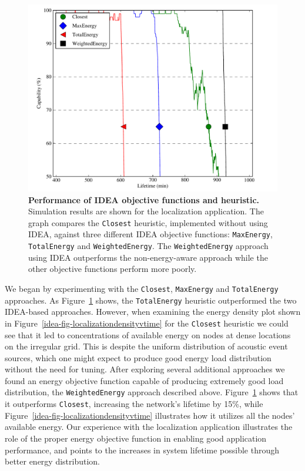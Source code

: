 \begin{figure}[t]
\label{idea-fig-ideavsheuristics}
\begin{center}
\includegraphics[width=\hsize]{./5-idea/figs/graph_capability_vs_time1210_2100.pdf}
\end{center}
\caption{\textbf{Performance of IDEA objective functions and heuristic.}
Simulation results are shown for the localization application. The graph
compares the \texttt{Closest} heuristic, implemented without using IDEA,
against three different IDEA objective functions: \texttt{MaxEnergy},
\texttt{TotalEnergy} and \texttt{WeightedEnergy}. The \texttt{WeightedEnergy}
approach using IDEA outperforms the non-energy-aware approach while the other
objective functions perform more poorly.}
\end{figure}

We began by experimenting with the \texttt{Closest}, \texttt{MaxEnergy} and
\texttt{TotalEnergy} approaches. As Figure~\ref{idea-fig-ideavsheuristics} shows,
the \texttt{TotalEnergy} heuristic outperformed the two IDEA-based
approaches. However, when examining the energy density plot shown in
Figure~\ref{idea-fig-localizationdensityvtime} for the \texttt{Closest} heuristic
we could see that it led to concentrations of available energy on nodes at
dense locations on the irregular grid. This is despite the uniform
distribution of acoustic event sources, which one might expect to produce
good energy load distribution without the need for tuning. After exploring
several additional approaches we found an energy objective function capable
of producing extremely good load distribution, the \texttt{WeightedEnergy}
approach described above. Figure~\ref{idea-fig-ideavsheuristics} shows that it
outperforms \texttt{Closest}, increasing the network's lifetime by 15\%,
while Figure~\ref{idea-fig-localizationdensityvtime} illustrates how it utilizes
all the nodes' available energy. Our experience with the localization
application illustrates the role of the proper energy objective function in
enabling good application performance, and points to the increases in
system lifetime possible through better energy distribution. 

